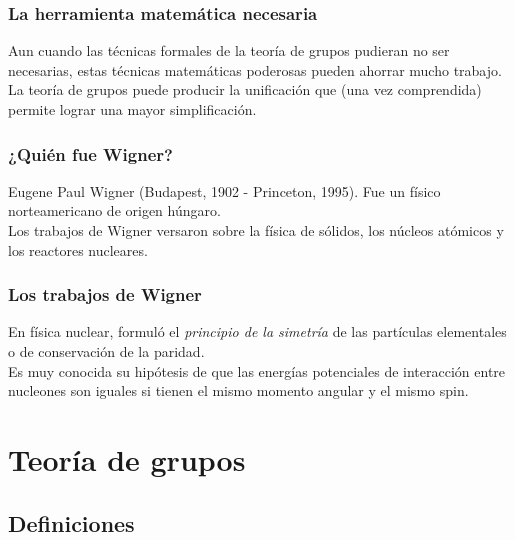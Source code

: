 \documentclass[12pt]{beamer}
\begin{document}
\begin{frame}
\frametitle{La herramienta matemática necesaria}
Aun cuando las técnicas formales de la teoría de grupos pudieran no ser necesarias, estas técnicas matemáticas poderosas pueden ahorrar mucho trabajo.
\\
\bigskip
\pause
La teoría de grupos puede producir la unificación que (una vez comprendida) permite lograr una mayor simplificación.
\end{frame}
\begin{frame}
\frametitle{¿Quién fue Wigner?}
Eugene Paul Wigner (Budapest, 1902 - Princeton, 1995). \pause Fue un físico norteamericano de origen húngaro.
\\
\bigskip
\pause
Los trabajos de Wigner versaron sobre la física de sólidos, los núcleos atómicos y los reactores nucleares.
\end{frame}
\begin{frame}
\frametitle{Los trabajos de Wigner}
En física nuclear, formuló el \emph{principio de la simetría} de las partículas elementales o de conservación de la paridad.
\pause
\\
\bigskip
Es muy conocida su hipótesis de que las energías potenciales de interacción entre nucleones son iguales si tienen el mismo momento angular y el mismo spin.
\end{frame}

\section{Teoría de grupos}
\subsection{Definiciones}
\end{document}
